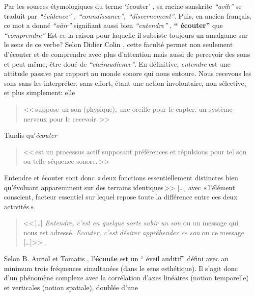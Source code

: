 Par les sources étymologiques du
terme `écouter' ,
 sa racine sanskrite \emph{ ``avih'' } se traduit par
 \emph{``évidence'' , ``connaissance'', ``discernement''}. Puis, en ancien
 français, ce mot a donné \textit{``oüir''} signifiant aussi bien \textit{``entendre''} ,
\textbf{`` écouter'' } que \textit{``comprendre''} \autocite {etymologieWeb}
 Est-ce la raison
pour laquelle il subsiste toujours un amalgame
sur le sens de ce verbe?
Selon Didier
Colin \autocite {colin2015}, cette faculté
permet non seulement d'écouter et de comprendre avec plus d'attention
mais aussi de percevoir des sons et peut même, être doué de
\textit{``clairaudience'}'.
En définitive, \emph{entendre} est une attitude passive par rapport au monde sonore
qui nous entoure. Nous recevons les sons sans les interpréter, sans
effort, étant une action involontaire, non
sélective, et plus simplement:  elle
\begin{quote}
	<<\,suppose un son (physique), une oreille
	pour le capter, un système nerveux pour le recevoir.\,>>\autocite[p. 2, ch . 1]{auriol:cle}
 \end{quote}
 Tandis qu'\textit{écouter}
\begin{quote}
	<<\,est un
	processus actif supposant préférences et répulsions pour tel son ou
	telle séquence sonore.\,>>\autocite[p. 2, ch . 1]{auriol:cle}

\end{quote}
Entendre et écouter sont donc  «\,deux
fonctions essentiellement distinctes bien qu'évoluant apparemment sur
des terrains iden\-ti\-ques\,>>
[\dots] avec «\,l'é\-lé\-ment cons\-cient, facteur essentiel sur lequel repose toute la
différence entre ces deux activités\,». \autocite[]{tomatis_oreille_1991}
\begin{quote}

	<<[\ldots] \emph{Entendre, c'est en quelque sorte subir
		un son} ou un message qui nous est adressé. \emph{Ecouter, c'est désirer appréhender ce son} ou ce message [\ldots]>>
	\autocite{tomatis:education}.
\end{quote}
Selon B. Auriol \autocite[18] {auriol:cle} et Tomatis \autocite[52]
{tomatis:loreille}, l\textbf{'écoute} est un `` éveil auditif''  défini avec au
minimum trois
fréquences simultanées (dans le sens esthétique). Il s'agit donc d'un phénomène
complexe avec la corrélation d'axes
linéaires (notion temporelle) et verticales (notion spatiale), doublée d'une
